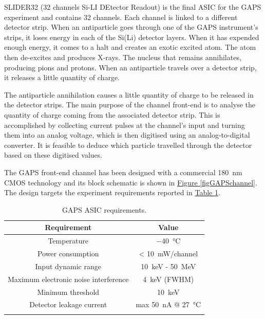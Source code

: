 SLIDER32 (32 channels Si-LI DEtector Readout) is the final ASIC for the GAPS experiment and contains 32 channels. Each channel is linked to a different detector strip. When an antiparticle goes through one of the GAPS instrument's strips, it loses energy in each of the Si(Li) detector layers. When it has expended enough energy, it comes to a halt and creates an exotic excited atom. The atom then de-excites and produces X-rays. The nucleus that remains annihilates, producing pions and protons. When an antiparticle travels over a detector strip, it releases a little quantity of charge.

\par
The antiparticle annihilation causes a little quantity of charge to be released in the detector strips. The main purpose of the channel front-end is to analyse the quantity of charge coming from the associated detector strip. This is accomplished by collecting current pulses at the channel's input and turning them into an analog voltage, which is then digitised using an analog-to-digital converter. It is feasible to deduce which particle travelled through the detector based on these digitised values.

\par
The GAPS front-end channel has been designed with a commercial \SI{180}{\nano\meter} CMOS technology and its block schematic is shown in \hyperref[figGAPSchannel]{Figure \ref{figGAPSchannel}}. The design targets the experiment requirements reported in \hyperref[tabGAPSrequirements]{Table \ref{tabGAPSrequirements}}.

\begin{table}[ht]
    \centering
    \begin{tabular}{c c} 
         \Xhline{2\arrayrulewidth}
         Requirement & Value \T\B \\
         \hline
         Temperature & \SI{-40}{\celsius} \T\B \\
         Power consumption & < \SI{10}{\milli\watt}/channel \T\B \\
         Input dynamic range & \SI{10}{\kilo\electronvolt} - \SI{50}{\mega\electronvolt} \T\B \\
         Maximum electronic noise interference & \SI{4}{\kilo\electronvolt} (FWHM) \T\B \\
         Minimum threshold & \SI{10}{\kilo\electronvolt} \T\B \\
         Detector leakage current & max \SI{50}{\nano\ampere} @ \SI{27}{\celsius} \T\B \\
         \Xhline{2\arrayrulewidth}
    \end{tabular}
    \caption{GAPS ASIC requirements.}
    \label{tabGAPSrequirements}
\end{table}

